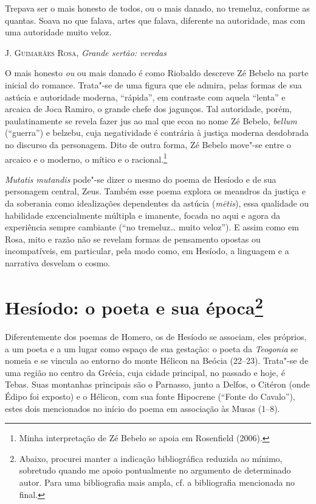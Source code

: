 
\epigraph{Trepava ser o mais honesto de todos, ou o mais
danado, no tremeluz, conforme as quantas. Soava
no que falava, artes que falava, diferente
na autoridade, mas com uma autoridade muito veloz.}{\textsc{J. Guimarães Rosa}, \emph{Grande sertão: veredas}}

O mais honesto \emph{ou} ou mais danado é como Riobaldo descreve Zé
Bebelo na parte inicial do romance. Trata"-se de uma figura que ele
admira, pelas formas de sua astúcia e autoridade moderna, ``rápida'', em
contraste com aquela ``lenta'' e arcaica de Joca Ramiro, o grande chefe
dos jagunços. Tal autoridade, porém, paulatinamente se revela fazer jus
ao mal que ecoa no nome Zé Bebelo, \emph{bellum} (``guerra'') e belzebu,
cuja negatividade é contrária à justiça moderna desdobrada no discurso
da personagem. Dito de outra forma, Zé Bebelo move"-se entre o arcaico e
o moderno, o mítico e o racional.\footnote{Minha interpretação de Zé
  Bebelo se apoia em Rosenfield (2006).}

\emph{Mutatis mutandis} pode"-se dizer o mesmo do poema de Hesíodo e de
sua personagem central, Zeus. Também esse poema explora os meandros da
justiça e da soberania como idealizações dependentes da astúcia
(\emph{mētis}), essa qualidade ou habilidade excencialmente múltipla e
imanente, focada no aqui e agora da experiência sempre cambiante (``no
tremeluz\ldots{} muito veloz''). E assim como em Rosa, mito e razão não
se revelam formas de pensamento opostas ou incompatíveis, em particular,
pela modo como, em Hesíodo, a linguagem e a narrativa desvelam o cosmo.

\section[Hesíodo: o poeta e sua época]{Hesíodo: o poeta e sua época\protect\footnote[*]{Abaixo, procurei manter a
  indicação bibliográfica reduzida ao mínimo, sobretudo quando me apoio
  pontualmente no argumento de determinado autor. Para uma bibliografia
  mais ampla, cf. a bibliografia mencionada no final.}}

Diferentemente dos poemas de Homero, os de Hesíodo se associam, eles
próprios, a um poeta e a um lugar como espaço de sua gestação: o poeta
da \emph{Teogonia} se nomeia e se vincula ao entorno do monte Hélicon na
Beócia (22--23). Trata"-se de uma região no centro da Grécia, cuja cidade
principal, no passado e hoje, é Tebas. Suas montanhas principais são o
Parnasso, junto a Delfos, o Citéron (onde Édipo foi exposto) e o
Hélicon, com sua fonte Hipocrene (``Fonte do Cavalo''), estes dois
mencionados no início do poema em associação às Musas (1--8).

